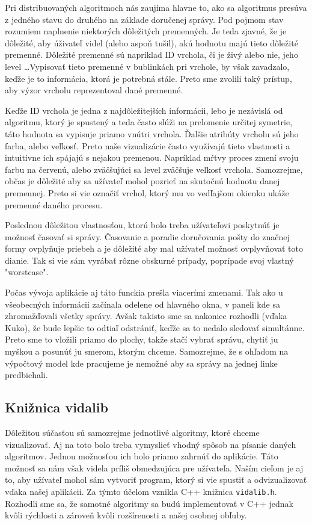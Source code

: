 Pri distribuovaných algoritmoch nás zaujíma hlavne to, ako sa algoritmus presúva z jedného stavu do
druhého na základe doručenej správy. Pod pojmom stav rozumiem naplnenie niektorých dôležitých
premenných. Je teda zjavné, že je dôležité, aby úživateľ videl (alebo aspoň tušil), akú hodnotu majú
tieto dôležité premenné. Dôležité premenné sú napríklad ID vrchola, či je živý alebo nie, jeho
level \dots Vypisovať tieto premenné v bublinkách pri vrchole, by však zavadzalo, keďže je to
informácia, ktorá je potrebná stále. Preto sme zvolili taký prístup, aby výzor vrcholu reprezentoval
dané premenné.

Keďže ID vrchola je jedna z najdôležitejších informácii, lebo je nezávislá od algoritmu, ktorý je
spustený a teda často slúži na prelomenie určitej symetrie, táto hodnota sa vypisuje priamo vnútri
vrchola. Ďalšie atribúty vrcholu sú jeho farba, alebo veľkosť. Preto naše vizualizácie často
využívajú tieto vlastnosti a intuitívne ich spájajú s nejakou premenou. Napríklad mŕtvy proces zmení
svoju farbu na červenú, alebo zväčšujúci sa level zväčšuje veľkosť vrchola.
Samozrejme, občas je dôležité aby sa užívateľ mohol pozrieť na skutočnú hodnotu danej premennej.
Preto si vie označiť vrchol, ktorý mu vo vedľajšom okienku ukáže premenné daného procesu.

Poslednou dôležitou vlastnosťou, ktorú bolo treba užívateľovi poskytnúť je možnosť časovať si
správy. Časovanie a poradie doručovania pošty do značnej formy ovplyňuje priebeh a je dôležité aby
mal užívateľ možnosť ovplyvňovať toto dianie. Tak si vie sám vyrábať rôzne obskurné prípady,
poprípade svoj vlastný "worstcase".

Počas vývoja aplikácie aj táto funckia prešla viacerími zmenami. Tak ako u všeobecných informácii
začínala odelene od hlavného okna, v paneli kde sa zhromažďovali všetky správy. Avšak takisto sme sa
nakoniec rozhodli (vďaka Kuko), že bude lepšie to odtiaľ odstrániť, keďže sa to nedalo sledovať
simultánne. Preto sme to vložili priamo do plochy, takže stačí vybrať správu, chytiť ju myškou a
posunúť ju smerom, ktorým chceme. Samozrejme, že s ohľadom na výpočtový model kde pracujeme je
nemožné aby sa správy na jednej linke predbiehali.

\subsection{Knižnica vidalib}

Dôležitou súčasťou sú samozrejme jednotlivé algoritmy, ktoré chceme vizualizovať. Aj na toto bolo
treba vymyslieť vhodný spôsob na písanie daných algoritmov. Jednou možnosťou ich bolo priamo zahrnúť
do aplikácie. Táto možnosť sa nám však videla príliš obmedzujúca pre užívateľa. Naším cieľom je aj
to, aby užívateľ mohol sám vytvoriť program, ktorý si vie spustiť a odvizualizovať vďaka našej
aplikácii. Za týmto účelom vznikla C++ knižnica \verb!vidalib.h!. Rozhodli sme sa, že samotné
algoritmy sa budú implementovať v C++ jednak kvôli rýchlosti a zároveň kvôli rozšírenosti a našej
osobnej obľuby.

